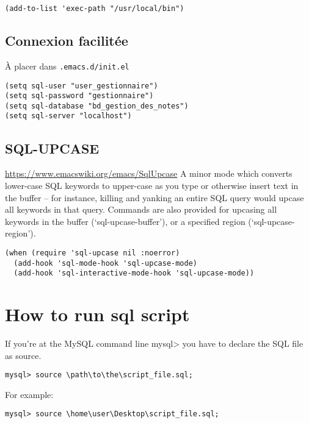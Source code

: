 \documentclass[11pt]{article}
\begin{document}
\begin{verbatim}
(add-to-list 'exec-path "/usr/local/bin")
\end{verbatim}

\subsection{Connexion facilitée}
\label{sec:orgc8fa61e}
À placer dans \texttt{.emacs.d/init.el}
\begin{verbatim}
(setq sql-user "user_gestionnaire")
(setq sql-password "gestionnaire")
(setq sql-database "bd_gestion_des_notes")
(setq sql-server "localhost")
\end{verbatim}

\subsection{SQL-UPCASE}
\label{sec:org1097cb0}
\url{https://www.emacswiki.org/emacs/SqlUpcase}
A minor mode which converts lower-case SQL keywords to upper-case as you type or otherwise insert text in the buffer – for instance, killing and yanking an entire SQL query would upcase all keywords in that query.
Commands are also provided for upcasing all keywords in the buffer (‘sql-upcase-buffer’), or a specified region (‘sql-upcase-region’).
\begin{verbatim}
(when (require 'sql-upcase nil :noerror)
  (add-hook 'sql-mode-hook 'sql-upcase-mode)
  (add-hook 'sql-interactive-mode-hook 'sql-upcase-mode))
\end{verbatim}


\section{How to run sql script}
\label{sec:orgb12d894}

If you’re at the MySQL command line mysql> you have to declare the SQL file as source.

\begin{verbatim}
mysql> source \path\to\the\script_file.sql;
\end{verbatim}

For example:

\begin{verbatim}
mysql> source \home\user\Desktop\script_file.sql;
\end{verbatim}
\end{document}
